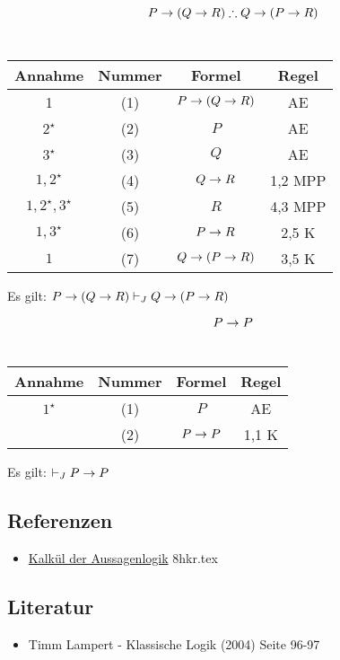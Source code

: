 \documentclass{sajzk}
\begin{document}
\begin{center}
    \[P \rightarrow (Q \rightarrow R) \therefore  Q \rightarrow (P \rightarrow R)\] \\

\begin{tabular}{|c|c|c|c|}
  \hline
  Annahme             & Nummer & Formel              & Regel \\
  \hline
  1                   & (1)    & $P \rightarrow (Q \rightarrow R)$   & AE \\
  \hline
  $2^\star$           & (2)    & $P$                 & AE \\
  \hline
  $3^\star$           & (3)    & $Q$                 & AE \\
  \hline
  $1,2^\star$         & (4)    & $Q \rightarrow R$           & 1,2 MPP \\
  \hline
  $1,2^\star,3^\star$ & (5)    & $R$                 & 4,3 MPP \\
  \hline
  $1,3^\star$         & (6)    & $P\rightarrow R$            & 2,5 K \\
  \hline
  $1$                 & (7)    & $Q \rightarrow (P\rightarrow R)$    & 3,5 K \\
  \hline
\end{tabular}
\end{center}
Es gilt: $P \rightarrow (Q \rightarrow R) \vdash_J Q \rightarrow (P \rightarrow R)$

\begin{center}
    \[P \rightarrow P\] \\

\begin{tabular}{|c|c|c|c|}
  \hline
  Annahme         & Nummer  & Formel      & Regel \\
  \hline
  $1^\star$       & (1)     & $P$         & AE \\
  \hline
                  & (2)     & $P \rightarrow P$   & 1,1 K \\
  \hline
\end{tabular}
\end{center}
Es gilt: $\vdash_J P \rightarrow P$
\subsection{Referenzen}
\begin{itemize}
    \item \href{8hkr.pdf}{Kalkül der Aussagenlogik} 8hkr.tex
\end{itemize}

\subsection{Literatur}
\begin{itemize}
    \item Timm Lampert - Klassische Logik (2004) Seite 96-97
\end{itemize}
\end{document}
